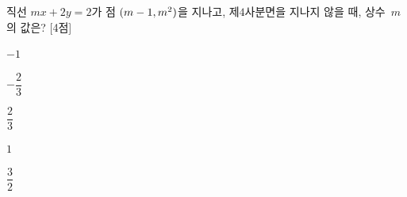 직선 $mx+2y=2$가 점 $(m-1{,}\mkern3mu m^2)$을 지나고, 제$4$사분면을 지나지 않을 때, 상수~$m$의 값은? \mbox{[4점]}
\begin{choices32}{\rule[-3ex]{0pt}{8ex}$-1$}{\rule[-3ex]{0pt}{8ex}$-\dfrac{2}{3}$}{\rule[-3ex]{0pt}{8ex}$\dfrac{2}{3}$}{\rule[-3ex]{0pt}{8ex}$1$}{\rule[-3ex]{0pt}{8ex}$\dfrac{3}{2}$}\end{choices32}
